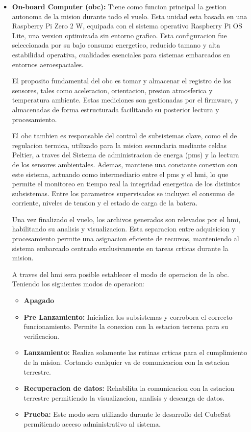 \begin{itemize}
      \item \textbf{On-board Computer (\acrshort{obc}):} Tiene como funcion principal la gestion autonoma de
        la mision durante todo el vuelo. Esta unidad esta basada en una Raspberry Pi Zero 2
        W, equipada con el sistema operativo Raspberry Pi OS Lite, una version optimizada sin
        entorno grafico. Esta configuracion fue seleccionada por su bajo consumo energetico,
        reducido tamano y alta estabilidad operativa, cualidades esenciales para sistemas embarcados
        en entornos aeroespaciales.

        El proposito fundamental del \acrshort{obc} es tomar y almacenar el registro de los sensores,
        tales como aceleracion, orientacion, presion atmosferica y temperatura ambiente. Estas
        mediciones son gestionadas por el firmware, y almacenadas de forma estructurada
        facilitando su posterior lectura y procesamiento.

        El \acrshort{obc} tambien es responsable del control de subsistemas clave, como el de regulacion
        termica, utilizado para la mision secundaria mediante celdas Peltier, a traves del Sistema de
        administracion de energa (\acrshort{pms}) y la lectura de los sensores ambientales. Ademas, mantiene una
        constante conexion con este sistema, actuando como intermediario entre el \acrshort{pms} y el \acrshort{hmi}, lo
        que permite el monitoreo en tiempo real la integridad energetica de los distintos subsistemas.
        Entre los parametros supervisados se incluyen el consumo de corriente, niveles de tension y el
        estado de carga de la batera.

        Una vez finalizado el vuelo, los archivos generados son relevados por el \acrshort{hmi}, habilitando
        su analisis y visualizacion. Esta separacion entre adquisicion y procesamiento permite una asignacion
        eficiente de recursos, manteniendo al sistema embarcado centrado
        exclusivamente en tareas crticas durante la mision.

        A traves del \acrshort{hmi} sera posible establecer el modo de operacion de la \acrshort{obc}. Teniendo los siguientes modos de operacion:
        \begin{itemize}
           \item \textbf{Apagado}
           \item \textbf{Pre Lanzamiento:} Inicializa los subsistemas y corrobora el correcto funcionamiento.
            Permite la conexion con la estacion terrena para su verificacion.
           \item \textbf{Lanzamiento:} Realiza solamente las rutinas crticas para el cumplimiento de la
          mision. Cortando cualquier va de comunicacion con la estacion terrestre.
           \item \textbf{Recuperacion de datos:} Rehabilita la comunicacion con la estacion terrestre
          permitiendo la visualizacion, analisis y descarga de datos.
           \item \textbf{Prueba:} Este modo sera utilizado durante le desarrollo del CubeSat permitiendo
          acceso administrativo al sistema.
        \end{itemize}


\end{itemize}

